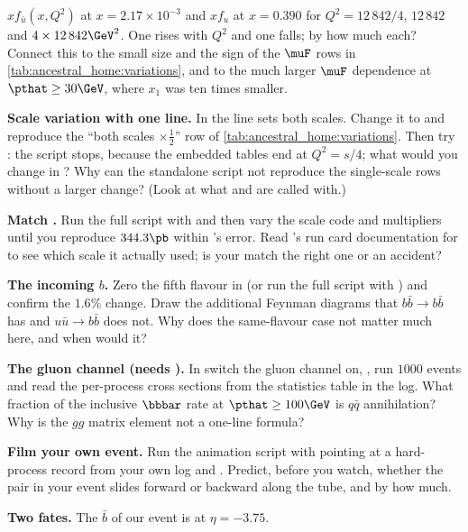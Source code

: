 \begin{exercises}
  $x f_{\bar u}(x,Q^2)$ at $x=2.17\times10^{-3}$ and $x f_u$ at $x=0.390$
  for $Q^2=12\,842/4$, $12\,842$ and $4\times12\,842\GeV^2$. One rises with
  $Q^2$ and one falls; by how much each? Connect this to the small size and
  the sign of the $\muF$ rows in \cref{tab:ancestral_home:variations}, and
  to the much larger $\muF$ dependence at $\pthat\ge30\GeV$, where
  $x_1$ was ten times smaller.
\item \textbf{Scale variation with one line.} In  the
  line  sets both scales. Change it to  and reproduce the ``both scales $\times\tfrac12$'' row of \cref{tab:ancestral_home:variations}. Then try : the script stops, because the embedded tables end at $Q^2=s/4$; what would you change in ? Why can the
  standalone script not reproduce the single-scale rows without a larger
  change? (Look at what  and  are called
  with.)
\item \textbf{Match \MG.} Run the full script with  and then vary the scale code and multipliers until you
  reproduce $344.3\pb$ within \MG's error. Read \MG's run card
  documentation for  to see which scale it
  actually used; is your match the right one or an accident?
\item \textbf{The incoming $b$.} Zero the fifth flavour in
   (or run the full script with ) and
  confirm the $1.6\%$ change. Draw the additional Feynman diagrams that
  $b\bar b\to b\bar b$ has and $u\bar u\to b\bar b$ does not. Why does the
  same-flavour case not matter much here, and when would it?
\item \textbf{The gluon channel (needs \CMSSW).} In 
  switch the gluon channel on, , run $1000$
  events and read the per-process cross sections from the statistics table
  in the log. What fraction of the inclusive $\bbbar$ rate at
  $\pthat\ge100\GeV$ is $q\bar q$ annihilation? Why is the $gg$ matrix
  element not a one-line formula?
\item \textbf{Film your own event.} Run the animation script with
   pointing at a hard-process record from your own \CMSSW log
  and . Predict, before you watch, whether the pair
  in your event slides forward or backward along the tube, and by how much.
\item \textbf{Two fates.} The $\bar b$ of our event is at $\eta=-3.75$.

\end{exercises}
